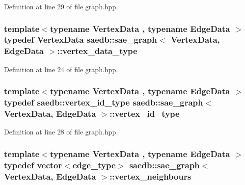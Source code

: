 Definition at line 29 of file graph.\-hpp.

\hypertarget{classsaedb_1_1sae__graph_a8e9dfeb979f49c35d427f364fb3f69f5}{
\subsubsection[{vertex\-\_\-data\-\_\-type}]{\setlength{\rightskip}{0pt plus 5cm}template$<$typename Vertex\-Data , typename Edge\-Data $>$ typedef Vertex\-Data {\bf saedb\-::sae\-\_\-graph}$<$ Vertex\-Data, Edge\-Data $>$\-::{\bf vertex\-\_\-data\-\_\-type}}}\label{d6/d2b/classsaedb_1_1sae__graph_a8e9dfeb979f49c35d427f364fb3f69f5}


Definition at line 24 of file graph.\-hpp.

\hypertarget{classsaedb_1_1sae__graph_a2f9a7bf2db556689f1cd9de9562ff41f}{
\subsubsection[{vertex\-\_\-id\-\_\-type}]{\setlength{\rightskip}{0pt plus 5cm}template$<$typename Vertex\-Data , typename Edge\-Data $>$ typedef {\bf saedb\-::vertex\-\_\-id\-\_\-type} {\bf saedb\-::sae\-\_\-graph}$<$ Vertex\-Data, Edge\-Data $>$\-::{\bf vertex\-\_\-id\-\_\-type}}}\label{d6/d2b/classsaedb_1_1sae__graph_a2f9a7bf2db556689f1cd9de9562ff41f}


Definition at line 28 of file graph.\-hpp.

\hypertarget{classsaedb_1_1sae__graph_aabe2a7d32910210e6b72c35412adbd1e}{
\subsubsection[{vertex\-\_\-neighbours}]{\setlength{\rightskip}{0pt plus 5cm}template$<$typename Vertex\-Data , typename Edge\-Data $>$ typedef vector$<${\bf edge\-\_\-type}$>$ {\bf saedb\-::sae\-\_\-graph}$<$ Vertex\-Data, Edge\-Data $>$\-::{\bf vertex\-\_\-neighbours}}}\label{d6/d2b/classsaedb_1_1sae__graph_aabe2a7d32910210e6b72c35412adbd1e}


